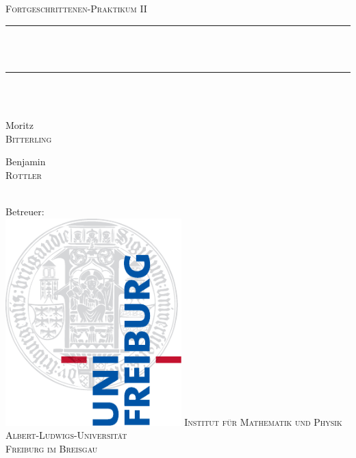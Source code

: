 \newcommand{\HRule}{\rule{\linewidth}{0.5mm}}
\begin{titlepage}
\begin{center}
  \textsc{\Large Fortgeschrittenen-Praktikum II}\\[0.5cm]
  \HRule \\[0.4cm]
  { \huge \bfseries \exptitle}\\
  \HRule \\[0.5cm]
  \large \expdate\\[0.5cm]  
  \begin{minipage}{0.4\textwidth}
    \begin{flushleft} \large
      Moritz \\ \textsc{Bitterling}
    \end{flushleft}
  \end{minipage}
  \hfill
  \begin{minipage}{0.4\textwidth}
    \begin{flushright} \large
      Benjamin \\ \textsc{Rottler}
    \end{flushright}
  \end{minipage}
  \\[1cm]
  \large 
  Betreuer: \exptutor \\[3cm]
  \includegraphics[height=8cm]{../../img/logo_uni.pdf}
  \vfill
  \normalsize
  \textsc{Institut für Mathematik und Physik} \\
  \textsc{Albert-Ludwigs-Universität} \\
  \textsc{Freiburg im Breisgau}
\end{center}
\end{titlepage}